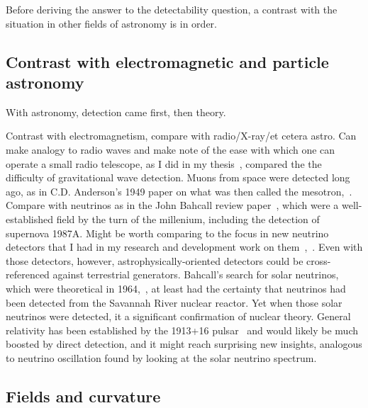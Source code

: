 Before deriving the answer to the detectability question, a contrast with the situation in other fields of astronomy is in order.

 
        \subsection{Contrast with electromagnetic and particle astronomy}
        \label{contrast_astro}

        With astronomy, detection came first, then theory.

            Contrast with electromagnetism, compare with radio/X-ray/et cetera astro. Can make analogy to radio waves and make note of the ease with which one can operate a small radio telescope, as I did in my thesis~\cite{MeadorsThesis2008}, compared the the difficulty of gravitational wave detection. Muons from space were detected long ago, as in C.D. Anderson's 1949 paper on what was then called the mesotron,~\cite{CDAnderson}. Compare with neutrinos as in the John Bahcall review paper~\cite{NeutrinoReview}, which were a well-established field by the turn of the millenium, including the detection of supernova 1987A. Might be worth comparing to the focus in new neutrino detectors that I had in my research and development work on them~\cite{EBubble2005},~\cite{MeadorsNevis2006}. Even with those detectors, however, astrophysically-oriented detectors could be cross-referenced against terrestrial generators. Bahcall's search for solar neutrinos, which were theoretical in 1964,~\cite{NeutrinosSolarTheoretical}, at least had the certainty that neutrinos had been detected from the Savannah River nuclear reactor. Yet when those solar neutrinos were detected, it a significant confirmation of nuclear theory. General relativity has been established by the 1913+16 pulsar~\cite{WeisbergTaylor2004} and would likely be much boosted by direct detection, and it might reach surprising new insights, analogous to neutrino oscillation found by looking at the solar neutrino spectrum.


\subsection{Fields and curvature}
\label{field_curvature_math}

